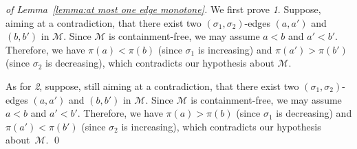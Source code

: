 \bigskip

\begin{proof}[of Lemma~\ref{lemma:at most one edge monotone}]
  We first prove \emph{1}. Suppose, aiming at a contradiction, that
  there exist two $(\sigma_1, \sigma_2)$-edges $(a, a')$ and $(b, b')$
  in $\mathcal{M}$. Since $\mathcal{M}$ is containment-free, we may
  assume $a < b$ and $a' < b'$. Therefore, we have $\pi(a) < \pi(b)$
  (since $\sigma_1$ is increasing) and $\pi(a') > \pi(b')$ (since
  $\sigma_2$ is decreasing), which contradicts our hypothesis about
  $\mathcal{M}$.

  As for \emph{2}, suppose, still aiming at a contradiction, that there
  exist two $(\sigma_1, \sigma_2)$-edges $(a, a')$ and $(b, b')$ in
  $\mathcal{M}$. Since $\mathcal{M}$ is containment-free, we may assume
  $a < b$ and $a' < b'$. Therefore, we have $\pi(a) > \pi(b)$ (since
  $\sigma_1$ is decreasing) and $\pi(a') < \pi(b')$ (since $\sigma_2$ is
  increasing), which contradicts our hypothesis about~$\mathcal{M}$.
  \qed
\end{proof}

\bigskip

